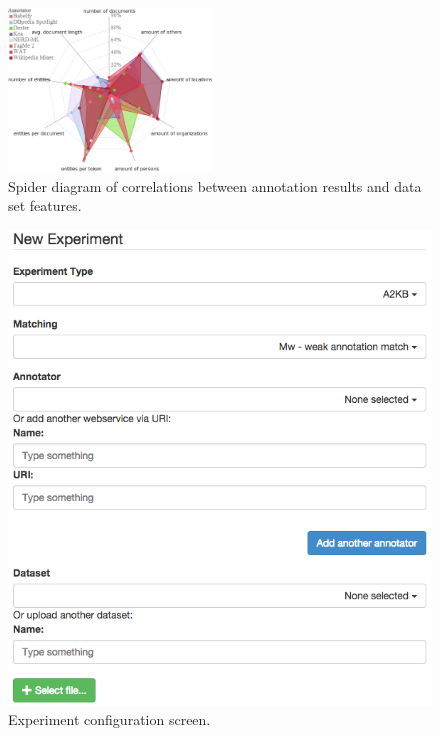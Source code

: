 \begin{figure}[htb]
\centering
\includegraphics[width=0.48\textwidth]{part_02/benchmarking/ESWC_GERBIL_demo/correlations.pdf}
\caption{Spider diagram of correlations between annotation results and data set features.}
\label{cha333:fig:spiderfeature}
\end{figure}


\begin{figure}
\centering
\includegraphics[width=0.95\linewidth]{part_02/benchmarking/ESWC_GERBIL_demo/screenshot}
\caption{Experiment configuration screen.}
\label{cha333:fig:screenshot}
\end{figure}

